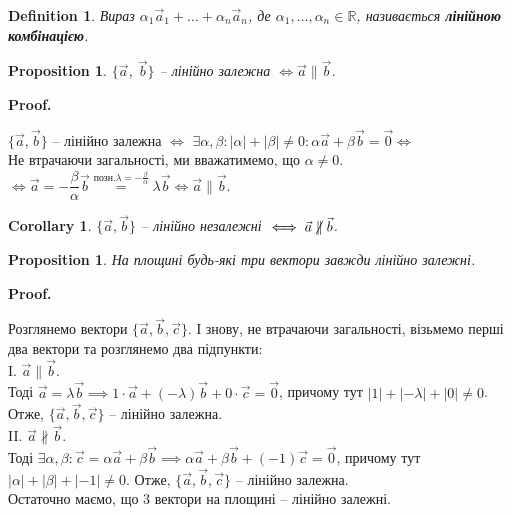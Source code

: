 \documentclass[a4paper, 10pt]{extarticle}
\makeatletter
\def\qed{$\blacksquare$}
\def\qed{$\blacksquare$}
\theoremstyle{theoremdd}
\theoremstyle{theoremdd}
\newtheorem{definition}[theorem]{Definition}
\theoremstyle{theoremdd}
\theoremstyle{theoremdd}
\theoremstyle{theoremdd}
\newtheorem{proposition}[theorem]{Proposition}
\theoremstyle{theoremdd}
\theoremstyle{theoremdd}
\theoremstyle{theoremdd}
\newtheorem{corollary}[theorem]{Corollary}
\renewenvironment{proof}[1][Proof.\\]{\par
\pushQED{\hfill \qed}%
\normalfont \topsep6\p@\@plus6\p@\relax
\trivlist
\item\relax
{\bfseries
#1\@addpunct{.}}\hspace\labelsep\ignorespaces
}{%
\popQED\endtrivlist\@endpefalse
}
\makeatother
\begin{document}
\begin{definition}
Вираз $\alpha_1 \vec{a}_1 + \dots + \alpha_n \vec{a}_n$, де $\alpha_1, \dots, \alpha_n \in \mathbb{R}$, називається \textbf{лінійною комбінацією}.
\end{definition}

\begin{proposition}
$\{\vec{a}$, $\vec{b}\}$ -- лінійно залежна $\iff \vec{a} \parallel \vec{b}$.
\end{proposition}

\begin{proof}
	$\{\vec{a},\vec{b}\}$ -- лінійно залежна $\iff$ $\exists \alpha, \beta: |\alpha| + |\beta| \neq 0: \alpha \vec{a} + \beta \vec{b} = \vec{0} \boxed{\iff}$\\
	Не втрачаючи загальності, ми вважатимемо, що $\alpha \neq 0$.\\
	$\boxed{\iff} \vec{a} = -\dfrac{\beta}{\alpha} \vec{b} \overset{\text{позн.} \lambda = -\frac{\beta}{\alpha}}{=} \lambda \vec{b} \iff \vec{a} \parallel \vec{b}$.
\end{proof}

\begin{corollary}
$\{\vec{a}, \vec{b}\}$ -- лінійно незалежні $\iff \vec{a} \centernot\parallel \vec{b}$.
\end{corollary}

\begin{proposition}
	На площині будь-які три вектори завжди лінійно залежні.
\end{proposition}

\begin{proof}
	Розглянемо вектори $\{\vec{a},\vec{b},\vec{c}\}$. І знову, не втрачаючи загальності, візьмемо перші два вектори та розглянемо два підпункти:\\
	I. $\vec{a} \parallel \vec{b}$.\\
	Тоді $\vec{a} = \lambda \vec{b} \implies 1 \cdot \vec{a} + (-\lambda) \vec{b} + 0 \cdot \vec{c} = \vec{0}$, причому тут $|1|+|-\lambda|+|0| \neq 0$. \\
	Отже, $\{\vec{a}, \vec{b}, \vec{c}\}$ -- лінійно залежна.
	\bigskip \\
	II. $\vec{a} \not\parallel \vec{b}$.\\
	Тоді $\exists \alpha, \beta: \vec{c} = \alpha \vec{a} + \beta \vec{b} \implies \alpha \vec{a} + \beta \vec{b} + (-1) \vec{c} = \vec{0}$, причому тут $|\alpha| + |\beta| + |-1| \neq 0$. Отже, $\{\vec{a}, \vec{b}, \vec{c}\}$ -- лінійно залежна.\\
	Остаточно маємо, що 3 вектори на площині -- лінійно залежні.
\end{proof}
\end{document}
